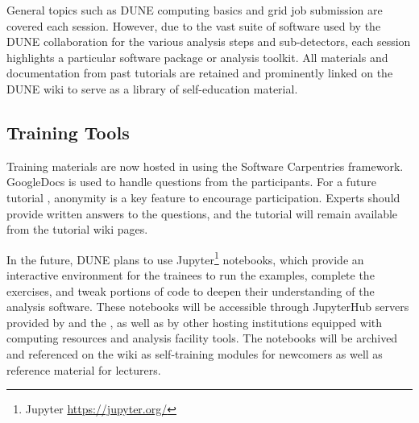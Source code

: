 \documentclass[../main-v1.tex]{subfiles}
\begin{document}

General topics such as DUNE computing basics and grid job submission are covered each %
session. However, due to the vast suite of software used by the DUNE collaboration for the various analysis steps and sub-detectors, each %
session highlights a particular software package or analysis toolkit.  All materials and documentation from past tutorials are retained and prominently linked on the DUNE wiki to serve as a library of self-education material. %

\subsection{Training Tools}
Training materials are now hosted in  using the Software Carpentries framework. 
GoogleDocs is used %
to %
handle questions from the participants. For a future tutorial , anonymity is a key feature to encourage participation. %
Experts %
should  provide written answers to the questions, and the tutorial  will remain available from %
the tutorial wiki pages. %

In the future, DUNE %
plans to use Jupyter\footnote{Jupyter\textcopyright{} \url{https://jupyter.org/}} notebooks, %
which provide an interactive environment for the trainees to run the examples, complete the exercises, and tweak portions of code to deepen their understanding of the analysis software. %
These notebooks will be accessible through %
JupyterHub servers provided by  and the , as well as by other hosting institutions equipped with computing resources and analysis facility tools. The notebooks will be archived and referenced on the wiki as self-training modules for newcomers as well as %
reference material for %
lecturers.
\end{document}
